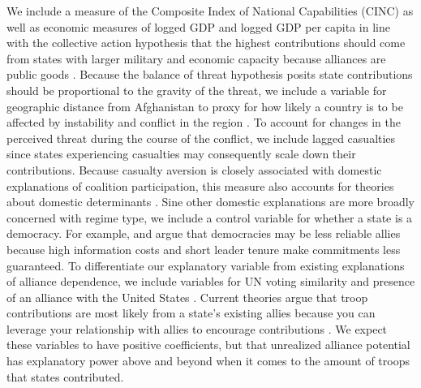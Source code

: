 \documentclass[12pt,letterpaper]{article}
\begin{document}
		We include a measure of the Composite Index of National Capabilities (CINC) as well as economic measures of logged GDP and logged GDP per capita in line with the collective action hypothesis that the highest contributions should come from states with larger military and economic capacity because alliances are public goods \citep{olson_economictheoryalliances_1966, singer_capabilitydistributionuncertainty_1972}. Because the balance of threat hypothesis posits state contributions should be proportional to the gravity of the threat, we include a variable for geographic distance from Afghanistan to proxy for how likely a country is to be affected by instability and conflict in the region \citep{weidmann_geographyinternationalsystem_2010}. To account for changes in the perceived threat during the course of the conflict, we include lagged casualties since states experiencing casualties may consequently scale down their contributions. Because casualty aversion is closely associated with domestic explanations of coalition participation, this measure also accounts for theories about domestic determinants \citep{koch_casualtiesconstituenciesdemocratic_2005, jakobsen_denmarkafghanistanworth_2015}. Sine other domestic explanations are more broadly concerned with regime type, we include a control variable for whether a state is a democracy. For example, \citet{gartzke_democracypreparationwar_2001} and \citet{gartzke_whydemocraciesmay_2004} argue that democracies may be less reliable allies because high information costs and short leader tenure make commitments less guaranteed. To differentiate our explanatory variable from existing explanations of alliance dependence, we include variables for UN voting similarity and presence of an alliance with the United States \citep{bailey_estimatingdynamicstate_2017}. Current theories argue that troop contributions are most likely from a state's existing allies because you can leverage your relationship with allies to encourage contributions \citep{davidson_neoclassicalrealistexplanation_2011}. We expect these variables to have positive coefficients, but that unrealized alliance potential has explanatory power above and beyond when it comes to the amount of troops that states contributed.
		
		\newpage
		
		\newpage
\end{document}
